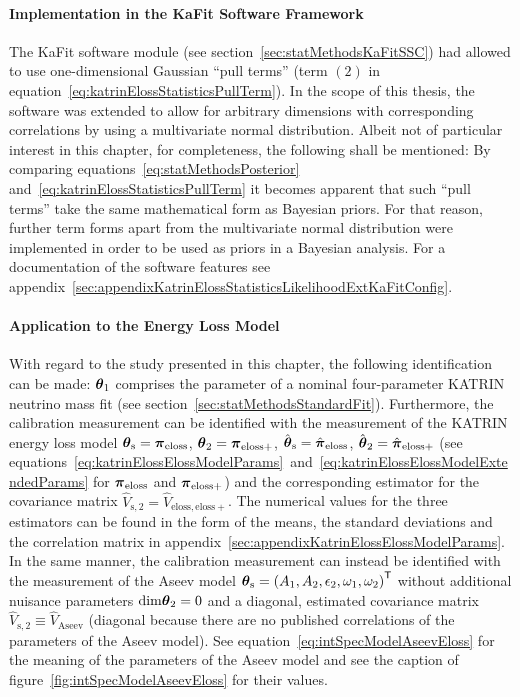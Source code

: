 \paragraph{Implementation in the KaFit Software Framework}
The KaFit software module (see section~\ref{sec:statMethodsKaFitSSC}) had allowed to use one-dimensional Gaussian ``pull terms'' (term $(2)$ in equation~\ref{eq:katrinElossStatisticsPullTerm}). In the scope of this thesis, the software was extended to allow for arbitrary dimensions with corresponding correlations by using a multivariate normal distribution. Albeit not of particular interest in this chapter, for completeness, the following shall be mentioned: By comparing equations~\eqref{eq:statMethodsPosterior} and~\eqref{eq:katrinElossStatisticsPullTerm} it becomes apparent that such ``pull terms'' take the same mathematical form as Bayesian priors. For that reason, further term forms apart from the multivariate normal distribution were implemented in order to be used as priors in a Bayesian analysis. For a documentation of the software features see appendix~\ref{sec:appendixKatrinElossStatisticsLikelihoodExtKaFitConfig}.

\paragraph{Application to the Energy Loss Model}
With regard to the study presented in this chapter, the following identification can be made: $\boldsymbol{\mathbf{\theta}}_1$ comprises the parameter of a nominal four-parameter KATRIN neutrino mass fit (see section~\ref{sec:statMethodsStandardFit}). Furthermore, the calibration measurement can be identified with the measurement of the KATRIN energy loss model $\boldsymbol{\mathbf{\theta}}_\mathrm{s}=\boldsymbol{\mathbf{\pi}}_\mathrm{eloss}$, $\boldsymbol{\mathbf{\theta}}_2=\boldsymbol{\mathbf{\pi}}_\mathrm{eloss+}$, $\hat{\boldsymbol{\mathbf{\theta}}}_\mathrm{s}=\hat{\boldsymbol{\mathbf{\pi}}}_\mathrm{eloss}$, $\hat{\boldsymbol{\mathbf{\theta}}}_2=\hat{\boldsymbol{\mathbf{\pi}}}_\mathrm{eloss+}$ (see equations~\ref{eq:katrinElossElossModelParams}~and~\ref{eq:katrinElossElossModelExtendedParams} for $\boldsymbol{\mathbf{\pi}}_\mathrm{eloss}$ and $\boldsymbol{\mathbf{\pi}}_\mathrm{eloss+}$) and the corresponding estimator for the covariance matrix $\hat{V}_\mathrm{s,2}=\hat{V}_\mathrm{eloss,eloss+}$. The numerical values for the three estimators can be found in the form of the means, the standard deviations and the correlation matrix in appendix~\ref{sec:appendixKatrinElossElossModelParams}. In the same manner, the calibration measurement can instead be identified with the measurement of the Aseev model $\boldsymbol{\mathbf{\theta}}_\mathrm{s}={(A_1, A_2,\epsilon_2,\omega_1,\omega_2)}^{\mathsf{T}}$ without additional nuisance parameters $\mathrm{dim}\boldsymbol{\mathbf{\theta}}_2=0$ and a diagonal, estimated covariance matrix $\hat{V}_\mathrm{s,2}\equiv\hat{V}_\mathrm{Aseev}$ (diagonal because there are no published correlations of the parameters of the Aseev model). See equation~\eqref{eq:intSpecModelAseevEloss} for the meaning  of the parameters of the Aseev model and see the caption of figure~\ref{fig:intSpecModelAseevEloss} for their values.


